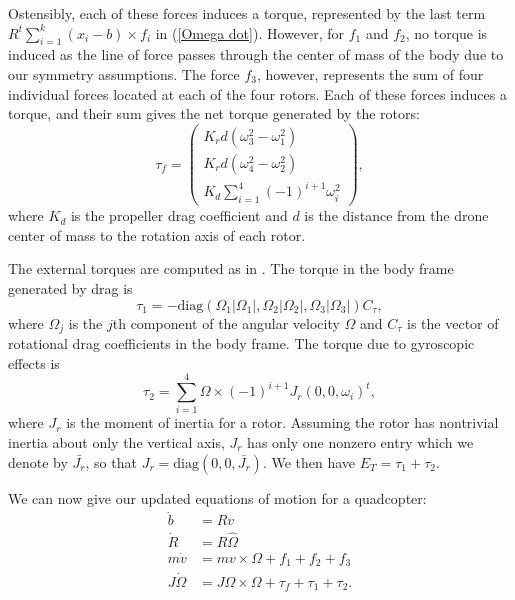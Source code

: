 \documentclass{aims}
\theoremstyle{definition}
\begin{document}
Ostensibly, each of these forces induces a torque, represented by the last term $R^t\sum_{i=1}^k(x_i-b) \times f_i$ in (\ref{Omega dot}).  However, for $f_1$ and $f_2$, no torque is induced as the line of force passes through the center of mass of the body due to our symmetry assumptions.  
The force $f_3$, however, represents the sum of four individual forces located at each of the four rotors.  Each of these forces induces a torque, and their sum gives the net torque generated by the rotors:
$$\tau_f=\begin{pmatrix}K_rd(\omega_3^2-\omega_1^2)\\K_rd(\omega_4^2-\omega_2^2)\\K_d\sum_{i=1}^4(-1)^{i+1}\omega_i^2
    \end{pmatrix},$$
where %
$K_d$ is the propeller drag coefficient and $d$ is the distance from the drone center of mass to the rotation axis of each rotor.  

The external torques are computed as in \cite{Bouadi, Stepanyan}.
The torque in the body frame generated by drag is 
$$\tau_1=-\text{diag}(\Omega_1|\Omega_1|,\Omega_2|\Omega_2|,\Omega_3|\Omega_3|)C_\tau,$$ 
where $\Omega_j$ is the $j$th component of the angular velocity $\Omega$ and $C_{\tau}$ is the vector of rotational drag coefficients in the body frame.
The torque due to gyroscopic effects is 
$$\tau_2=\sum_{i=1}^4\Omega\times (-1)^{i+1}J_r(0,0,\omega_i)^t,$$
where $J_r$ is the moment of inertia for a rotor.  Assuming the rotor has nontrivial inertia about only the vertical axis, $J_r$ has only one nonzero entry which we denote by $\bar{J_r}$, so that $J_r = \text{diag}(0, 0, \bar{J_r})$.
We then have $E_T=\tau_1  + \tau_2$.

We can now give our updated equations of motion for a quadcopter:
\begin{align}
\dot{b} &= Rv \label{b dot again} \\ 
\dot{R} &= R\hat{\Omega}  \label{R dot again} \\
m\dot{v} &= mv \times \Omega + f_1 +f_2+f_3  \label{v dot again} \\
J\dot{\Omega} &= J\Omega \times \Omega + \tau_f + \tau_1 + \tau_2. \label{Omega dot again}
\end{align}
\end{document}
